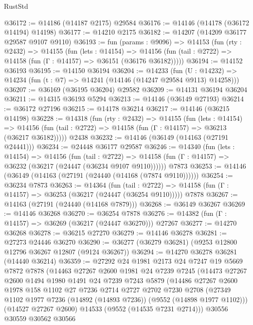 \begin{lexlean}{RustStd}
\begin{coremodule}
@36172 := @14186 (@14187 @2175) @29584
@36176 := @14146 (@14178 (@36172 @14194) @14198)
@36177 := @14210 @2175
@36182 := @14207 (@14209 @36177 @29587 @9107 @9110)
@36193 := fun (params : @9096) =>
  @14153
    (fun (rty : @2432) =>
    @14155
      (fun (lets : @14154) =>
      @14156 (fun (tail : @2722) => @14158 (fun (Γ : @14157) => @36151 (@36176 @36182)))))
@36194 := @14152 @36193
@36195 := @14150 @36194
@36204 := @14233
    (fun (U : @14232) => @14234 (fun (t : @7) => @14241 (@14146 (@14247 @29584 @9113) @14258)))
@36207 := @36169 (@36195 @36204) @29582
@36209 := @14131 @36194 @36204
@36211 := @14315 @36193 @5294
@36213 := @14146 (@36149 @27193)
@36214 := @36172 @27196
@36215 := @14178 @36214
@36217 := @14146 (@36215 @14198)
@36228 := @14318
    (fun (rty : @2432) =>
    @14155
      (fun (lets : @14154) =>
      @14156 (fun (tail : @2722) => @14158 (fun (Γ : @14157) => @36213 (@36217 @36182)))))
    @2438
@36232 := @14146 (@36149 (@14163 (@27191 @24441)))
@36234 := @24448 @36177 @29587
@36246 := @14340
    (fun (lets : @14154) =>
    @14156
      (fun (tail : @2722) =>
      @14158 (fun (Γ : @14157) => @36232 (@36217 (@24447 (@36234 @9107 @9110))))))
    @7873
@36253 := @14146 (@36149 (@14163 (@27191 (@24440 (@14168 (@7874 @9110))))))
@36254 := @36234 @7873
@36263 := @14364
    (fun (tail : @2722) => @14158 (fun (Γ : @14157) => @36253 (@36217 (@24447 (@36254 @9110)))))
    @7878
@36267 := @14163 (@27191 (@24440 (@14168 @7879)))
@36268 := @36149 @36267
@36269 := @14146 @36268
@36270 := @36254 @7878
@36276 := @14382 (fun (Γ : @14157) => @36269 (@36217 (@24447 @36270))) @27267
@36277 := @14270 @36268
@36278 := @36215 @27270
@36279 := @14146 @36278
@36281 := @27273 @24446 @36270
@36290 := @36277 (@36279 @36281) (@9253 @12800 @12796 @36267 @12807 (@9124 @36267))
@36294 := @14270 @36278 @36281 (@14440 @36214)
@36359 := @27292
    @24
    @1981
    @2173
    @24
    @7247
    @19
    @5669
    @7872
    @7878
    (@14463
      @27267
      @2600
      @1981
      @24
      @7239
      @7245
      (@14473
        @27267
        @2600
        @1494
        @1980
        @1491
        @24
        @7239
        @7243
        @5879
        (@14486
          @27267
          @2600
          @1978
          @158
          @1102
          @27
          @7236
          @2714
          @2727
          @2702
          @7230
          @2708
          (@27349 @1102 @1977 @7236 (@14892 (@14893 @7236)) (@9552 (@14898 @1977 @1102)))
          (@14527 @27267 @2600)
          @14533
          (@9552 (@14535 @7231 @2714)))
        @30556
        @30559
        @30562
        @30566

\end{coremodule}
\end{lexlean}
